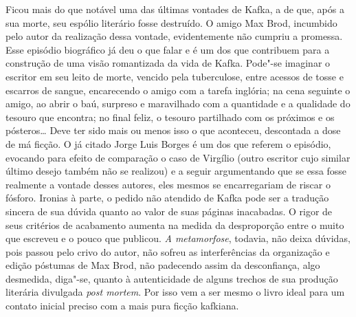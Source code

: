 Ficou mais do que notável uma das últimas vontades de Kafka, a de que,
após a sua morte, seu espólio literário fosse destruído. O amigo Max
Brod, incumbido pelo autor da realização dessa vontade, evidentemente
não cumpriu a promessa. Esse episódio biográfico já deu o que falar e é
um dos que contribuem para a construção de uma visão romantizada da vida de
Kafka. Pode"-se imaginar o escritor em seu leito de morte, vencido
pela tuberculose, entre acessos de tosse e escarros de sangue,
encarecendo o amigo com a tarefa inglória; na cena seguinte o amigo, ao
abrir o baú, surpreso e maravilhado com a quantidade e a qualidade do
tesouro que encontra; no final feliz, o tesouro partilhado com os
próximos e os pósteros\ldots{} Deve ter sido mais ou menos isso o que
aconteceu, descontada a dose de má ficção. O já citado Jorge Luis
Borges é um dos que referem o episódio, evocando para efeito de comparação o caso de Virgílio
(outro escritor cujo similar último desejo também não se realizou) e a
seguir argumentando que se essa fosse realmente a vontade desses
autores, eles mesmos se encarregariam de riscar o fósforo. Ironias à
parte, o pedido não atendido de Kafka pode ser a tradução sincera de
sua dúvida quanto ao valor de suas páginas inacabadas. O rigor de seus
critérios de acabamento aumenta na medida da desproporção entre o muito
que escreveu e o pouco que publicou. \textit{A metamorfose}, todavia,
não deixa dúvidas, pois passou pelo crivo do autor, não sofreu as
interferências da organização e edição póstumas de Max Brod, não
padecendo assim da desconfiança, algo desmedida, diga"-se, quanto à
autenticidade de alguns trechos de sua produção literária divulgada
\textit{post mortem}. Por isso vem a ser mesmo o livro ideal para um
contato inicial preciso com a mais pura ficção kafkiana.

